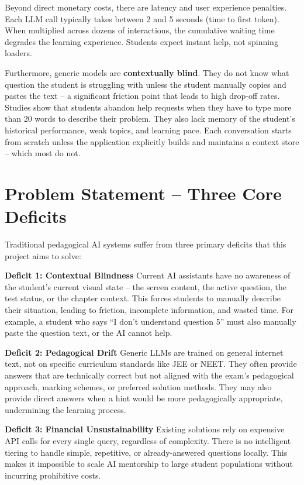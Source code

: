 Beyond direct monetary costs, there are latency and user experience penalties. Each LLM call typically takes between 2 and 5 seconds (time to first token). When multiplied across dozens of interactions, the cumulative waiting time degrades the learning experience. Students expect instant help, not spinning loaders.

Furthermore, generic models are \textbf{contextually blind}. They do not know what question the student is struggling with unless the student manually copies and pastes the text – a significant friction point that leads to high drop-off rates. Studies show that students abandon help requests when they have to type more than 20 words to describe their problem. They also lack memory of the student's historical performance, weak topics, and learning pace. Each conversation starts from scratch unless the application explicitly builds and maintains a context store – which most do not.

\section{Problem Statement – Three Core Deficits}

Traditional pedagogical AI systems suffer from three primary deficits that this project aims to solve:

\textbf{Deficit 1: Contextual Blindness}  
Current AI assistants have no awareness of the student's current visual state – the screen content, the active question, the test status, or the chapter context. This forces students to manually describe their situation, leading to friction, incomplete information, and wasted time. For example, a student who says ``I don't understand question 5'' must also manually paste the question text, or the AI cannot help.

\textbf{Deficit 2: Pedagogical Drift}  
Generic LLMs are trained on general internet text, not on specific curriculum standards like JEE or NEET. They often provide answers that are technically correct but not aligned with the exam's pedagogical approach, marking schemes, or preferred solution methods. They may also provide direct answers when a hint would be more pedagogically appropriate, undermining the learning process.

\textbf{Deficit 3: Financial Unsustainability}  
Existing solutions rely on expensive API calls for every single query, regardless of complexity. There is no intelligent tiering to handle simple, repetitive, or already-answered questions locally. This makes it impossible to scale AI mentorship to large student populations without incurring prohibitive costs.
